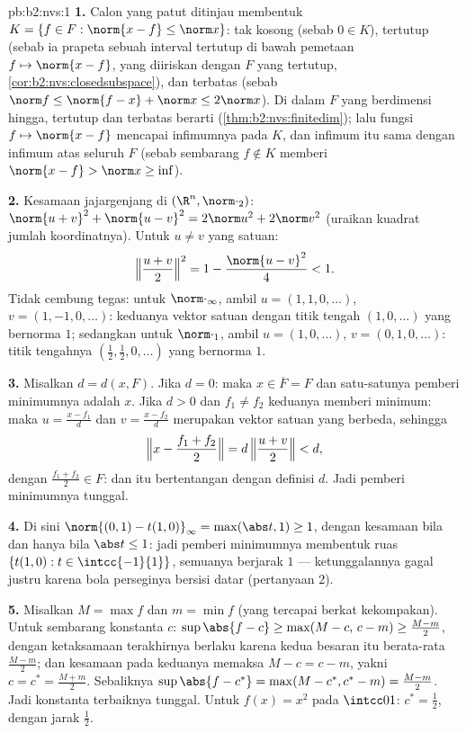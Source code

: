 \begin{solution}{pb:b2:nvs:1}
\textbf{1.} Calon yang patut ditinjau membentuk $K = \{f \in F
: \norm{x - f} \leq \norm x\}$: tak kosong (sebab $0 \in K$), tertutup
(sebab ia prapeta sebuah interval tertutup di bawah pemetaan  $f
\mapsto \norm{x - f}$, yang diiriskan dengan $F$ yang tertutup,
\cref{cor:b2:nvs:closedsubspace}), dan terbatas (sebab $\norm f \leq
\norm{f - x} + \norm x \leq 2\norm x$). Di dalam $F$ yang
berdimensi hingga, tertutup dan terbatas berarti 
(\cref{thm:b2:nvs:finitedim}); lalu fungsi  $f
\mapsto \norm{x - f}$ mencapai infimumnya pada $K$, dan infimum itu sama
dengan infimum atas seluruh $F$ (sebab sembarang $f \notin K$ memberi
$\norm{x - f} > \norm x \geq \inf$).

\textbf{2.} Kesamaan jajargenjang di $(\R^n,
\norm\cdot_2)$: $\norm{u + v}^2 + \norm{u - v}^2 = 2\norm u^2 +
2\norm v^2$ (uraikan kuadrat jumlah koordinatnya). Untuk
$u \neq v$ yang satuan:
\[
\Bigl\Vert\frac{u+v}2\Bigr\Vert^2 = 1 - \frac{\norm{u -
v}^2}{4} < 1 .
\]
Tidak cembung tegas: untuk $\norm\cdot_\infty$, ambil $u = (1, 1, 0,
\dots)$, $v = (1, -1, 0, \dots)$: keduanya vektor satuan dengan titik
tengah $(1, 0, \dots)$ yang bernorma $1$; sedangkan untuk
$\norm\cdot_1$, ambil $u = (1, 0, \dots)$, $v = (0, 1, 0, \dots)$: titik
tengahnya $(\frac12, \frac12, 0, \dots)$ yang bernorma $1$.

\textbf{3.} Misalkan $d = d(x, F)$. Jika $d = 0$: maka $x \in \overline F
= F$ dan satu-satunya pemberi minimumnya adalah $x$. Jika $d > 0$ dan
$f_1 \neq f_2$ keduanya memberi minimum: maka $u = \frac{x - f_1}{d}$ dan
$v = \frac{x - f_2}{d}$ merupakan vektor satuan yang berbeda, sehingga
\[
\Bigl\Vert x - \frac{f_1 + f_2}2\Bigr\Vert
= d\,\Bigl\Vert\frac{u + v}2\Bigr\Vert < d ,
\]
dengan $\frac{f_1 + f_2}2 \in F$: dan itu bertentangan dengan definisi
$d$. Jadi pemberi minimumnya tunggal.

\textbf{4.} Di sini $\norm{(0,1) - t(1,0)}_\infty = \max(\abs t, 1)
\geq 1$, dengan kesamaan bila dan hanya bila $\abs t \leq 1$: jadi
pemberi minimumnya membentuk ruas $\{t(1, 0) : t \in \intcc{-1}{1}\}$,
semuanya berjarak $1$ --- ketunggalannya gagal justru karena bola
perseginya bersisi datar (pertanyaan 2).

\textbf{5.} Misalkan $M = \max f$ dan $m = \min f$ (yang tercapai berkat
kekompakan). Untuk sembarang konstanta $c$: $\sup\abs{f - c} \geq
\max(M - c,\, c - m) \geq \frac{M - m}2$, dengan ketaksamaan terakhirnya
berlaku karena kedua besaran itu berata-rata $\frac{M-m}2$; dan kesamaan
pada keduanya memaksa $M - c = c - m$, yakni $c = c^* = \frac{M + m}2$.
Sebaliknya $\sup\abs{f - c^*} = \max(M - c^*, c^* - m) =
\frac{M - m}2$. Jadi konstanta terbaiknya tunggal. Untuk $f(x) = x^2$ pada
$\intcc01$: $c^* = \frac12$, dengan jarak $\frac12$.


\end{solution}

